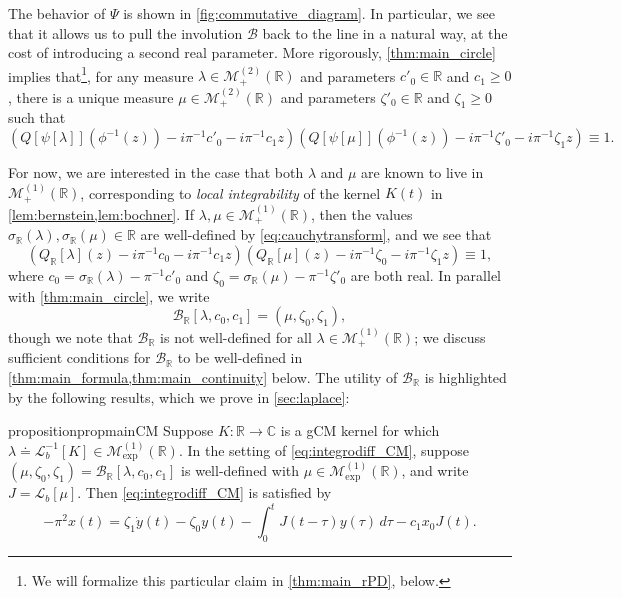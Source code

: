 \documentclass{cams-l} %
\newcommand{\dave}[1]{#1}\newcommand{\davebegin}{}\newcommand{\daveend}{}\newcommand{\george}[1]{#1}
\newcommand{\CC}{\mathbb C}
\newcommand{\RR}{\mathbb R}
\newcommand{\cL}{\mathcal L}
\newcommand{\cM}{\mathcal M}
\newcommand{\cB}{\mathcal B}
\theoremstyle{definition}
\theoremstyle{remark}
\numberwithin{equation}{section}
\begin{document}
The behavior of $\Psi$ is shown in \cref{fig:commutative_diagram}. In particular, we see that it allows us to pull the involution $\cB$ back to the line in a natural way, at the cost of introducing a second real parameter. More rigorously, \cref{thm:main_circle} implies that\footnote{We will formalize this \dave{particular} claim in \cref{thm:main_rPD}, below.}, for any measure $\lambda\in\cM_+^{(2)}(\RR)$ and parameters $c'_0\in\RR$ and $c_1\geq 0$, there is a unique measure $\mu\in\cM_+^{(2)}(\RR)$ and parameters $\zeta'_0\in\RR$ and $\zeta_1\geq 0$ such that
\[\left(Q[\psi[\lambda]](\phi^{-1}(z)) - i\pi^{-1}c'_0 - i\pi^{-1}c_1z\right)\left(Q[\psi[\mu]](\phi^{-1}(z)) - i\pi^{-1}\zeta'_0 - i\pi^{-1}\zeta_1z\right)\equiv 1.\]

\dave{For now, we are interested in the case that both $\lambda$ and $\mu$ are known to live in $\cM_+^{(1)}(\RR)$, corresponding to \emph{local integrability} of the kernel $K(t)$ in \cref{lem:bernstein,lem:bochner}.} If $\lambda,\mu\in\cM_+^{(1)}(\RR)$, then the values $\sigma_\RR(\lambda),\sigma_\RR(\mu)\in\RR$ are well-defined by \cref{eq:cauchytransform}, and we see that
\[\left(Q_\RR[\lambda](z) - i\pi^{-1}c_0 - i\pi^{-1}c_1z\right)\left(Q_\RR[\mu](z) - i\pi^{-1}\zeta_0 - i\pi^{-1}\zeta_1z\right)\equiv 1,\]
where $c_0 = \sigma_\RR(\lambda) - \pi^{-1}c'_0$ and $\zeta_0 = \sigma_\RR(\mu) - \pi^{-1}\zeta'_0$ are both real.
In parallel with \cref{thm:main_circle}, we write
\begin{equation}\label{eq:define_B}
	\cB_\RR[\lambda,c_0,c_1] = (\mu,\zeta_0,\zeta_1),
\end{equation}
\dave{though we note that $\cB_\RR$ is not well-defined for all $\lambda\in\cM_+^{(1)}(\RR)$; we discuss sufficient conditions for $\cB_\RR$ to be well-defined in \cref{thm:main_formula,thm:main_continuity} below. The utility of $\cB_\RR$ is highlighted by the following results, which we prove in \cref{sec:laplace}:}
\begin{restatable}{proposition}{propmainCM}\label{prop:main_CM}
    Suppose $K:\RR\to\CC$ is a gCM kernel for which $\lambda\doteq\cL_b^{-1}[K]\in\cM_\mathrm{exp}^{(1)}(\RR)$. In the setting of \ref{eq:integrodiff_CM}, suppose  $(\mu,\zeta_0,\zeta_1)=\cB_\RR[\lambda,c_0,c_1]$ is well-defined with $\mu\in\cM_\mathrm{exp}^{(1)}(\RR)$, and write $J = \cL_b[\mu]$. Then \ref{eq:integrodiff_CM} is satisfied by
    \[-\pi^{2}x(t) = \zeta_1\dot{y}(t) - \zeta_0y(t) - \int_0^t J(t-\tau)y(\tau)\,d\tau - c_1x_0 J(t).\]
\end{restatable}
\end{document}
